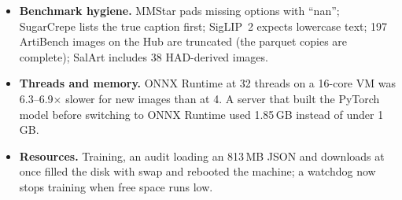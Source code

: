 \documentclass[10pt]{article}
\begin{document}
\begin{itemize}
\item \textbf{Benchmark hygiene.} MMStar pads missing options with ``nan''; SugarCrepe lists the true caption first; SigLIP~2 expects lowercase text; 197 ArtiBench images on the Hub are truncated (the parquet copies are complete); SalArt includes 38 HAD-derived images.
\item \textbf{Threads and memory.} ONNX Runtime at 32 threads on a 16-core VM was 6.3--6.9$\times$ slower for new images than at 4. A server that built the PyTorch model before switching to ONNX Runtime used 1.85\,GB instead of under 1\,GB.
\item \textbf{Resources.} Training, an audit loading an 813\,MB JSON and downloads at once filled the disk with swap and rebooted the machine; a watchdog now stops training when free space runs low.
\end{itemize}
\end{document}
